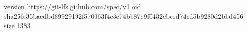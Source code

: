 version https://git-lfs.github.com/spec/v1
oid sha256:35bacdbd89929192f570063f4c3e74bb87e9f0432ebced74cd5b9280d2bbd456
size 1383
